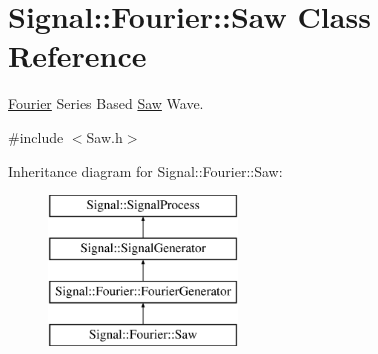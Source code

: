 \hypertarget{classSignal_1_1Fourier_1_1Saw}{\section{Signal\+:\+:Fourier\+:\+:Saw Class Reference}
\label{classSignal_1_1Fourier_1_1Saw}
}


\hyperlink{namespaceSignal_1_1Fourier}{Fourier} Series Based \hyperlink{classSignal_1_1Fourier_1_1Saw}{Saw} Wave.  




{\ttfamily \#include $<$Saw.\+h$>$}

Inheritance diagram for Signal\+:\+:Fourier\+:\+:Saw\+:\begin{figure}[H]
\begin{center}
\leavevmode
\includegraphics[height=4.000000cm]{classSignal_1_1Fourier_1_1Saw}
\end{center}
\end{figure}
